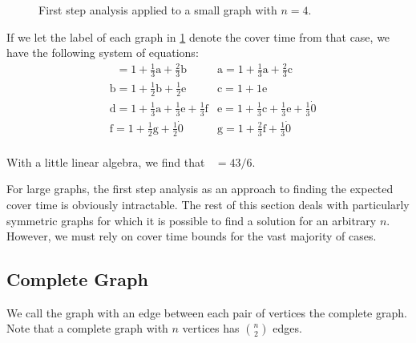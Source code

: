 \documentclass[12pt]{article}
\theoremstyle{definition}
\DeclareMathOperator{\tcov}{t_\textrm{cov}}      %
\begin{document}
\begin{figure}[ht]
	\caption{First step analysis applied to a small graph with $n=4$.}\label{fig:example}
\end{figure}

If we let the label of each graph in \cref{fig:example}
denote the cover time from that case, we have the following system
of equations:
\begin{align}
&\tcov = 1 + \frac{1}{3}\textrm{a} + \frac{2}{3}\textrm{b}
&\textrm{a} = 1 + \frac{1}{3}\textrm{a} + \frac{2}{3}\textrm{c} \nonumber \\
&\textrm{b} = 1 + \frac{1}{2}\textrm{b} + \frac{1}{2}\textrm{e}
&\textrm{c} = 1 + 1\textrm{e} \nonumber \\
&\textrm{d} = 1 + \frac{1}{3}\textrm{a} + \frac{1}{3}\textrm{e} + \frac{1}{3}\textrm{f}
&\textrm{e} = 1 + \frac{1}{3}\textrm{c} + \frac{1}{3}\textrm{e} + \frac{1}{3}\dot 0\nonumber \\
&\textrm{f} = 1 + \frac{1}{2}\textrm{g} + \frac{1}{2}\dot 0
&\textrm{g} = 1 + \frac{2}{3}\textrm{f} + \frac{1}{3}\dot 0\nonumber \\
\end{align}

With a little linear algebra, we find that $\tcov = 43/6$.

For large graphs, the first step analysis as an approach to finding the expected
cover time is obviously intractable.
The rest of this section deals with particularly symmetric graphs
for which it is possible to find a solution for an arbitrary $n$.
However, we must rely on cover time bounds for the vast majority of cases.

\subsection{Complete Graph}\label{sec:complete}
We call the graph with an edge between each pair of vertices the
complete graph.
Note that a complete graph with $n$ vertices has ${n \choose 2}$ edges.
\end{document}
